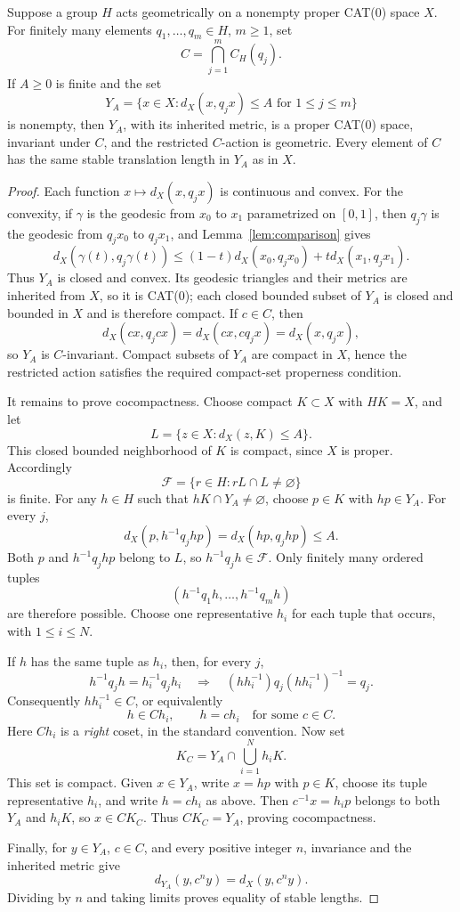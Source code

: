 \begin{lemma}\label{lem:geometric-centralizer}
Suppose a group $H$ acts geometrically on a nonempty proper CAT(0)
space $X$.  For finitely many elements $q_1,\ldots,q_m\in H$,
$m\ge1$, set
\[
 C=\bigcap_{j=1}^m C_H(q_j).
\]
If $A\ge0$ is finite and the set
\[
 Y_A=\{x\in X:d_X(x,q_jx)\le A\text{ for }1\le j\le m\}
\]
is nonempty, then $Y_A$, with its inherited metric, is a proper
CAT(0) space, invariant under $C$, and the restricted $C$-action
is geometric.  Every element of $C$ has the same stable translation
length in $Y_A$ as in $X$.
\end{lemma}

\begin{proof}
Each function $x\mapsto d_X(x,q_jx)$ is continuous and convex.
For the convexity, if $\gamma$ is the geodesic from $x_0$ to $x_1$
parametrized on $[0,1]$, then $q_j\gamma$ is the geodesic from
$q_jx_0$ to $q_jx_1$, and Lemma~\ref{lem:comparison} gives
\[
 d_X(\gamma(t),q_j\gamma(t))
 \le (1-t)d_X(x_0,q_jx_0)+t d_X(x_1,q_jx_1).
\]
Thus $Y_A$ is closed and convex.  Its geodesic triangles and their
metrics are inherited from $X$, so it is CAT(0); each closed bounded
subset of $Y_A$ is closed and bounded in $X$ and is therefore compact.
If $c\in C$, then
\[
 d_X(cx,q_jcx)=d_X(cx,cq_jx)=d_X(x,q_jx),
\]
so $Y_A$ is $C$-invariant.  Compact subsets of $Y_A$ are compact
in $X$, hence the restricted action satisfies the required
compact-set properness condition.

It remains to prove cocompactness.  Choose compact $K\subset X$
with $HK=X$, and let
\[
 L=\{z\in X:d_X(z,K)\le A\}.
\]
This closed bounded neighborhood of $K$ is compact, since $X$ is
proper.  Accordingly
\[
 \mathcal F=\{r\in H:rL\cap L\ne\varnothing\}
\]
is finite.  For any $h\in H$ such that $hK\cap Y_A\ne\varnothing$,
choose $p\in K$ with $hp\in Y_A$.  For every $j$,
\[
 d_X(p,h^{-1}q_jhp)=d_X(hp,q_jhp)\le A.
\]
Both $p$ and $h^{-1}q_jhp$ belong to $L$, so
$h^{-1}q_jh\in\mathcal F$.  Only finitely many ordered tuples
\[
 (h^{-1}q_1h,\ldots,h^{-1}q_mh)
\]
are therefore possible.  Choose one representative $h_i$ for each
tuple that occurs, with $1\le i\le N$.

If $h$ has the same tuple as $h_i$, then, for every $j$,
\[
 h^{-1}q_jh=h_i^{-1}q_jh_i
 \quad\Longrightarrow\quad
 (hh_i^{-1})q_j(hh_i^{-1})^{-1}=q_j.
\]
Consequently $hh_i^{-1}\in C$, or equivalently
\[
 h\in C h_i,\qquad h=ch_i\quad\text{for some }c\in C.
\]
Here $C h_i$ is a \emph{right} coset, in the standard convention.
Now set
\[
 K_C=Y_A\cap\bigcup_{i=1}^N h_iK.
\]
This set is compact.  Given $x\in Y_A$, write $x=hp$ with $p\in K$,
choose its tuple representative $h_i$, and write $h=ch_i$ as above.
Then $c^{-1}x=h_ip$ belongs to both $Y_A$ and $h_iK$, so $x\in CK_C$.
Thus $CK_C=Y_A$, proving cocompactness.

Finally, for $y\in Y_A$, $c\in C$, and every positive integer $n$,
invariance and the inherited metric give
\[
 d_{Y_A}(y,c^ny)=d_X(y,c^ny).
\]
Dividing by $n$ and taking limits proves equality of stable lengths.
\end{proof}

